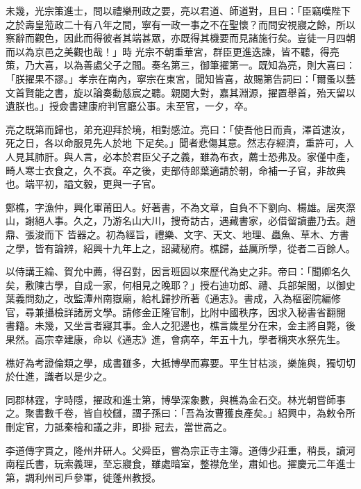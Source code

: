 \begin{pinyinscope}
 未幾，光宗策進士，問以禮樂刑政之要，亮以君道、師道對，且曰：「臣竊嘆陛下之於壽皇蒞政二十有八年之間，寧有一政一事之不在聖懷？而問安視寢之餘，所以察辭而觀色，因此而得彼者其端甚眾，亦既得其機要而見諸施行矣。豈徒一月四朝而以為京邑之美觀也哉！」時
 光宗不朝重華宮，群臣更進迭諫，皆不聽，得亮策，乃大喜，以為善處父子之間。奏名第三，御筆擢第一。既知為亮，則大喜曰：「朕擢果不謬。」孝宗在南內，寧宗在東宮，聞知皆喜，故賜第告詞曰：「爾蚤以藝文首賢能之書，旋以論奏動慈宸之聽。親閱大對，嘉其淵源，擢置舉首，殆天留以遺朕也。」授僉書建康府判官廳公事。未至官，一夕，卒。



 亮之既第而歸也，弟充迎拜於境，相對感泣。亮曰：「使吾他日而貴，澤首逮汝，死之日，各以命服見先人於地
 下足矣。」聞者悲傷其意。然志存經濟，重許可，人人見其肺肝。與人言，必本於君臣父子之義，雖為布衣，薦士恐弗及。家僅中產，畸人寒士衣食之，久不衰。卒之後，吏部侍郎葉適請於朝，命補一子官，非故典也。端平初，謚文毅，更與一子官。



 鄭樵，字漁仲，興化軍莆田人。好著書，不為文章，自負不下劉向、楊雄。居夾漈山，謝絕人事。久之，乃游名山大川，搜奇訪古，遇藏書家，必借留讀盡乃去。趙鼎、張浚而下
 皆器之。初為經旨，禮樂、文字、天文、地理、蟲魚、草木、方書之學，皆有論辨，紹興十九年上之，詔藏秘府。樵歸，益厲所學，從者二百餘人。



 以侍講王綸、賀允中薦，得召對，因言班固以來歷代為史之非。帝曰：「聞卿名久矣，敷陳古學，自成一家，何相見之晚耶？」授右迪功郎、禮、兵部架閣，以御史葉義問劾之，改監潭州南嶽廟，給札歸抄所著《通志》。書成，入為樞密院編修官，尋兼攝檢詳諸房文學。請修金正隆官制，比附中國秩序，因求入秘書省翻閱
 書籍。未幾，又坐言者寢其事。金人之犯邊也，樵言歲星分在宋，金主將自斃，後果然。高宗幸建康，命以《通志》進，會病卒，年五十九，學者稱夾水祭先生。



 樵好為考證倫類之學，成書雖多，大抵博學而寡要。平生甘枯淡，樂施與，獨切切於仕進，識者以是少之。



 同郡林霆，字時隱，擢政和進士第，博學深象數，與樵為金石交。林光朝嘗師事之。聚書數千卷，皆自校讎，謂子孫曰：「吾為汝曹獲良產矣。」紹興中，為敕令所刪定官，力詆秦檜和議之非，即掛
 冠去，當世高之。



 李道傳字貫之，隆州井研人。父舜臣，嘗為宗正寺主簿。道傳少莊重，稍長，讀河南程氏書，玩索義理，至忘寢食，雖處暗室，整襟危坐，肅如也。擢慶元二年進士第，調利州司戶參軍，徙蓬州教授。




\end{pinyinscope}
